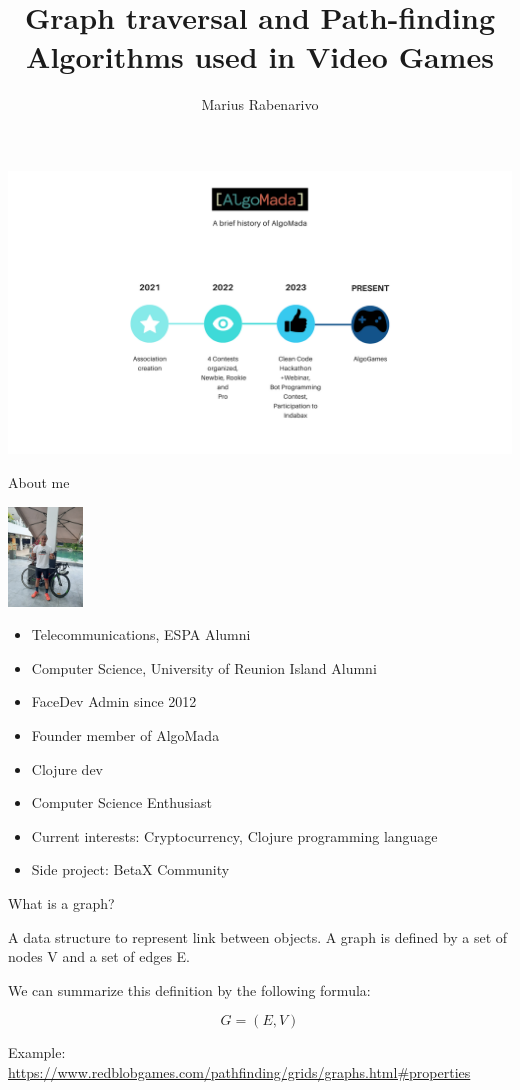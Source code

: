 \documentclass[ignorenonframetext,]{beamer}
\title{Graph traversal and Path-finding Algorithms used in Video Games}
\author{Marius Rabenarivo}
\date{}
\providecommand{\tightlist}{%
  \setlength{\itemsep}{0pt}\setlength{\parskip}{0pt}}
\begin{document}
\frame{\titlepage}

\begin{frame}

\includegraphics{AlgoMada.png}

\end{frame}

\begin{frame}{About me}
\protect\hypertarget{about-me}{}

\includegraphics[width=\textwidth,height=1.04167in]{marius.jpg}

\begin{itemize}
\tightlist
\item
  Telecommunications, ESPA Alumni
\item
  Computer Science, University of Reunion Island Alumni
\item
  FaceDev Admin since 2012
\item
  Founder member of AlgoMada
\item
  Clojure dev
\item
  Computer Science Enthusiast
\item
  Current interests: Cryptocurrency, Clojure programming language
\item
  Side project: BetaX Community
\end{itemize}

\end{frame}

\begin{frame}{What is a graph?}
\protect\hypertarget{what-is-a-graph}{}

A data structure to represent link between objects. A graph is defined
by a set of nodes V and a set of edges E.

We can summarize this definition by the following formula:

\[
G = (E, V)
\]

Example:
\url{https://www.redblobgames.com/pathfinding/grids/graphs.html\#properties}

\end{frame}
\end{document}
